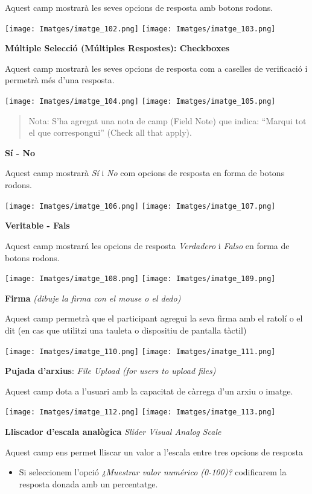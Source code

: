 \documentclass[
]{article}
\providecommand{\tightlist}{%
  \setlength{\itemsep}{0pt}\setlength{\parskip}{0pt}}
\begin{document}
Aquest camp mostrarà les seves opcions de resposta amb botons rodons.

\texttt{[image: Imatges/imatge\_102.png]}
\texttt{[image: Imatges/imatge\_103.png]}

\textbf{Múltiple Selecció (Múltiples Respostes): Checkboxes}

Aquest camp mostrarà les seves opcions de resposta com a caselles de verificació i permetrà més d'una resposta.

\texttt{[image: Imatges/imatge\_104.png]}
\texttt{[image: Imatges/imatge\_105.png]}

\begin{quote}
Nota: S'ha agregat una nota de camp (Field Note) que indica: ``Marqui tot el que correspongui'' (Check all that apply).
\end{quote}

\textbf{Sí - No}

Aquest camp mostrarà \emph{Sí} i \emph{No} com opcions de resposta en forma de botons rodons.

\texttt{[image: Imatges/imatge\_106.png]}
\texttt{[image: Imatges/imatge\_107.png]}

\textbf{Veritable - Fals}

Aquest camp mostrará les opcions de resposta \emph{Verdadero} i \emph{Falso} en forma de botons rodons.

\texttt{[image: Imatges/imatge\_108.png]}
\texttt{[image: Imatges/imatge\_109.png]}

\textbf{Firma} \emph{(dibuje la firma con el mouse o el dedo)}

Aquest camp permetrà que el participant agregui la seva firma amb el ratolí o el dit (en cas que utilitzi una tauleta o dispositiu de pantalla tàctil)

\texttt{[image: Imatges/imatge\_110.png]}
\texttt{[image: Imatges/imatge\_111.png]}

\textbf{Pujada d'arxius}: \emph{File Upload (for users to upload files)}

Aquest camp dota a l'usuari amb la capacitat de càrrega d'un arxiu o imatge.

\texttt{[image: Imatges/imatge\_112.png]}
\texttt{[image: Imatges/imatge\_113.png]}

\textbf{Lliscador d'escala analògica} \emph{Slider Visual Analog Scale}

Aquest camp ens permet lliscar un valor a l'escala entre tres opcions de resposta

\begin{itemize}
\tightlist
\item
  Si seleccionem l'opció \emph{¿Muestrar valor numérico (0-100)?} codificarem la resposta donada amb un percentatge.
\end{itemize}
\end{document}
